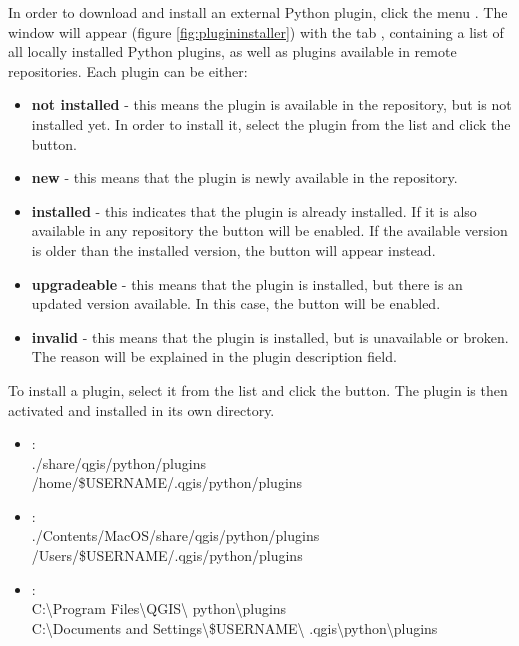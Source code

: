 In order to download and install an external Python plugin, click the
menu  \arrow {}. The  window will appear
(figure \ref{fig:plugininstaller}) with the tab , containing
a list of all locally installed Python plugins, as well as plugins
available in remote repositories. Each plugin can be either:
\begin{itemize}[label=--]
\item \textbf{not installed} - this means the plugin is available in the repository, but is not installed yet. In order to install it, select the plugin from the list and click the  button.
\item \textbf{new} - this means that the plugin is newly available in the repository.
\item \textbf{installed} - this indicates that the plugin is already installed. If it is also available in any repository the  button will be enabled. If the available version is older than the installed version, the  button will appear instead.
\item \textbf{upgradeable} - this means that the plugin is installed, but there is an updated version available. In this case, the  button will be enabled.
\item \textbf{invalid} - this means that the plugin is installed, but is unavailable or broken. The reason will be explained in the plugin description field.
\end{itemize}


To install a plugin, select it from the list and click the 
button. The plugin is then activated and installed in its own directory.

\begin{itemize}[label=--]
\item {}:\\
./share/qgis/python/plugins \\
/home/\$USERNAME/.qgis/python/plugins
\item {}:\\
./Contents/MacOS/share/qgis/python/plugins \\
/Users/\$USERNAME/.qgis/python/plugins
\item {}:\\
C:\textbackslash Program Files\textbackslash QGIS\textbackslash
python\textbackslash plugins \\
C:\textbackslash Documents and Settings\textbackslash\$USERNAME\textbackslash
.qgis\textbackslash python\textbackslash plugins
\end{itemize}

